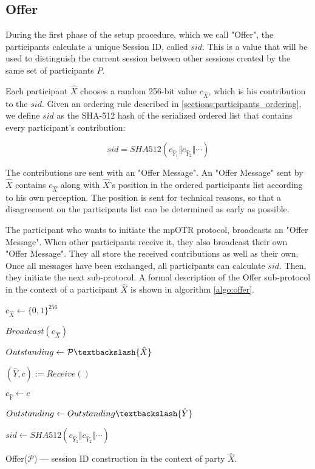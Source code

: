 \subsection{Offer}
\label{subsections:offer}
During the first phase of the setup procedure, which we call "Offer", the participants calculate a unique Session ID, called $sid$. This is a value that will be used to distinguish the current session between other sessions created by the same set of participants $P$.

Each participant $\hat{X}$ chooses a random 256-bit value $c_{\hat{X}}$, which is his contribution to the $sid$. Given an ordering rule described in \ref{sections:participants_ordering}, we define $sid$ as the SHA-512 hash of the serialized ordered list that contains every participant's contribution:

\[
  sid = SHA512(c_{\hat{Y}_1} \Vert c_{\hat{Y}_2} \Vert \cdots)
\]

The contributions are sent with an "Offer Message". An "Offer Message" sent by $\hat{X}$ contains $c_{\hat{X}}$ along with $\hat{X}$'s position in the ordered participants list according to his own perception. The position is sent for technical reasons, so that a disagreement on the participants list can be determined as early as possible.

The participant who wants to initiate the mpOTR protocol, broadcasts an "Offer Message". When other participants receive it, they also broadcast their own "Offer Message". They all store the received contributions as well as their own. Once all messages have been exchanged, all participants can calculate $sid$. Then, they initiate the next sub-protocol. A formal description of the Offer sub-protocol in the context of a participant $\hat{X}$ is shown in algorithm \ref{algo:offer}.

\begin{algorithm}[H]
  \Begin
  {
	$c_{\hat{X}} \leftarrow \{0,1\}^{256}$
	
	$Broadcast(c_{\hat{X}})$
	
	$Outstanding \leftarrow \mathcal{P} \textbackslash \{\hat{X}\}$

    {    
      $(\hat{Y}, c) := Receive()$
      
      {      
        $c_{\hat{Y}} \leftarrow c$
      
        $Outstanding \leftarrow Outstanding \textbackslash \{\hat{Y}\}$
      }
    }
   
    $sid \leftarrow SHA512(c_{\hat{Y}_1} \Vert c_{\hat{Y}_2} \Vert \cdots)$


  }
  \caption{Offer($\mathcal{P}$) --- session ID construction in the context of party $\hat{X}$.}
  \label{algo:offer}
\end{algorithm}

